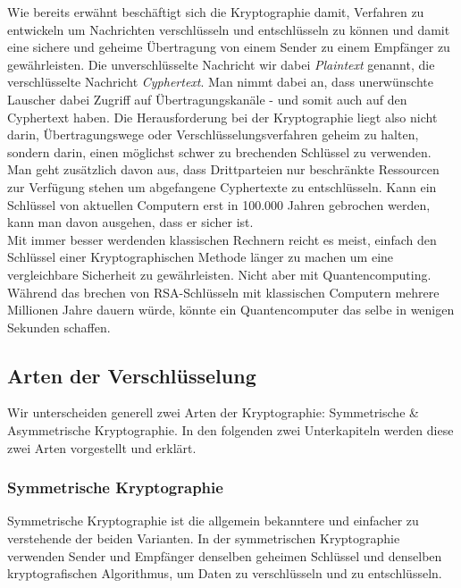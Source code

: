 \documentclass[12pt]{IEEEtran}
\begin{document}
Wie bereits erwähnt beschäftigt sich die Kryptographie damit, Verfahren zu entwickeln um Nachrichten verschlüsseln und entschlüsseln zu können und damit eine sichere und geheime Übertragung von einem Sender zu einem Empfänger zu gewährleisten. Die unverschlüsselte Nachricht wir dabei \textit{Plaintext} genannt, die verschlüsselte Nachricht \textit{Cyphertext}. Man nimmt dabei an, dass unerwünschte Lauscher dabei Zugriff auf Übertragungskanäle - und somit auch auf den Cyphertext haben. Die Herausforderung bei der Kryptographie liegt also nicht darin, Übertragungswege oder Verschlüsselungsverfahren geheim zu halten, sondern darin, einen möglichst schwer zu brechenden Schlüssel zu verwenden. \cite{Uhl2022Krypto} \\

Man geht zusätzlich davon aus, dass Drittparteien nur beschränkte Ressourcen zur Verfügung stehen um abgefangene Cyphertexte zu entschlüsseln. Kann ein Schlüssel von aktuellen Computern erst in 100.000 Jahren gebrochen werden, kann man davon ausgehen, dass er sicher ist. \cite{mavroeidis2018impact} \\
Mit immer besser werdenden klassischen Rechnern reicht es meist, einfach den Schlüssel einer Kryptographischen Methode länger zu machen um eine vergleichbare Sicherheit zu gewährleisten. Nicht aber mit Quantencomputing. Während das brechen von RSA-Schlüsseln mit klassischen Computern mehrere Millionen Jahre dauern würde, könnte ein Quantencomputer das selbe in wenigen Sekunden schaffen.

\subsection{Arten der Verschlüsselung}

Wir unterscheiden generell zwei Arten der Kryptographie: Symmetrische \& Asymmetrische Kryptographie. In den folgenden zwei Unterkapiteln werden diese zwei Arten vorgestellt und erklärt.

\subsubsection{Symmetrische Kryptographie}

Symmetrische Kryptographie ist die allgemein bekanntere und einfacher zu verstehende der beiden Varianten. In der symmetrischen Kryptographie verwenden Sender und Empfänger denselben geheimen Schlüssel und denselben kryptografischen Algorithmus, um Daten zu verschlüsseln und zu entschlüsseln. \\
\end{document}
